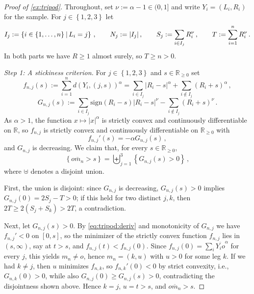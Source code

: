 \documentclass{article}
\newcommand{\R}{\mathbb{R}}
\newcommand{\Rp}{\R_{\geq0}}
\newcommand{\lcb}{\left\lbrace} %
\newcommand{\rcb}{\right\rbrace} %
\newcommand{\cb}[1]{\lcb #1 \rcb} %
\newcommand{\lb}{\left(} %
\newcommand{\rb}{\right)} %
\newcommand{\br}[1]{\lb #1 \rb} %
\newcommand{\absof}[1]{\vert #1 \vert} %
\newcommand{\sizedMid}[2]{#1 \, \kern-\nulldelimiterspace\mathopen{}\left| \vphantom{#1}\,#2\right.\mathclose{}\kern-\nulldelimiterspace}
\newcommand{\setByEle}[2]{\cb{\sizedMid{#1}{#2}}}
\newcommand{\eqcm}{\,,} %
\newcommand{\eqfs}{\,.}
\newcommand{\ol}[2]{\overline{#1#2}}
\newcommand{\sign}{\mathrm{sign}}
\begin{document}
\begin{proof}[Proof of \cref{ex:tripod}]
    Throughout, set $\nu := \alpha-1 \in (0,1]$ and write $Y_i = (L_i, R_i)$ for the sample.
    For $j\in\cb{1,2,3}$ let
    \begin{equation}
        I_j := \setByEle{i\in\cb{1,\dots,n}}{L_i = j}
        \eqcm\qquad
        N_j := \absof{I_j}
        \eqcm\qquad
        S_j := \sum_{i\in I_j} R_i^\nu
        \eqcm\qquad
        T := \sum_{i=1}^n R_i^\nu
        \eqfs
    \end{equation}
    In both parts we have $R\geq1$ almost surely, so $T\geq n>0$.
    
    \emph{Step 1: A stickiness criterion.}
    For $j\in\cb{1,2,3}$ and $s\in\Rp$ set
    \begin{equation}
        f_{n,j}(s)
        :=
        \sum_{i=1}^n d(Y_i, (j,s))^\alpha
        =
        \sum_{i\in I_j} \absof{R_i-s}^\alpha + \sum_{i\notin I_j} \br{R_i+s}^\alpha
        \eqcm
    \end{equation}
    \begin{equation}\label{eq:tripod:G}
        G_{n,j}(s)
        :=
        \sum_{i\in I_j} \sign(R_i-s)\absof{R_i-s}^{\nu} - \sum_{i\notin I_j} \br{R_i+s}^{\nu}
        \eqfs
    \end{equation}
    As $\alpha>1$, the function $x\mapsto\absof x^\alpha$ is strictly convex and continuously differentiable on $\R$, so $f_{n,j}$ is strictly convex and continuously differentiable on $\Rp$ with
    \begin{equation}\label{eq:tripod:deriv}
        f_{n,j}'(s) = -\alpha  G_{n,j}(s)
        \eqcm
    \end{equation}
    and $G_{n,j}$ is decreasing. We claim that, for every $s\in\Rp$,
    \begin{equation}\label{eq:tripod:crit}
        \cb{\ol o{m_n} > s}
        =
        \biguplus_{j=1}^3 \cb{G_{n,j}(s) > 0}
        \eqcm
    \end{equation}
    where $\uplus$ denotes a disjoint union.
    
    First, the union is disjoint: since $G_{n,j}$ is decreasing, $G_{n,j}(s)>0$ implies $G_{n,j}(0) = 2S_j - T > 0$; if this held for two distinct $j,k$, then $2T \geq 2(S_j+S_k) > 2T$, a contradiction.
    
    Next, let $G_{n,j}(s)>0$. By \eqref{eq:tripod:deriv} and monotonicity of $G_{n,j}$ we have $f_{n,j}' < 0$ on $[0,s]$, so the minimizer of the strictly convex function $f_{n,j}$ lies in $(s,\infty)$, say at $t>s$, and $f_{n,j}(t) < f_{n,j}(0)$. Since $f_{n,j}(0) = \sum_i \ol{Y_i}o^\alpha$ for every $j$, this yields $m_n \neq o$, hence $m_n = (k,u)$ with $u>0$ for some leg $k$. If we had $k\neq j$, then $u$ minimizes $f_{n,k}$, so $f_{n,k}'(0)<0$ by strict convexity, i.e., $G_{n,k}(0)>0$, while also $G_{n,j}(0)\geq G_{n,j}(s)>0$, contradicting the disjointness shown above. Hence $k=j$, $u=t>s$, and $\ol o{m_n}>s$.
    

\end{proof}
\end{document}
